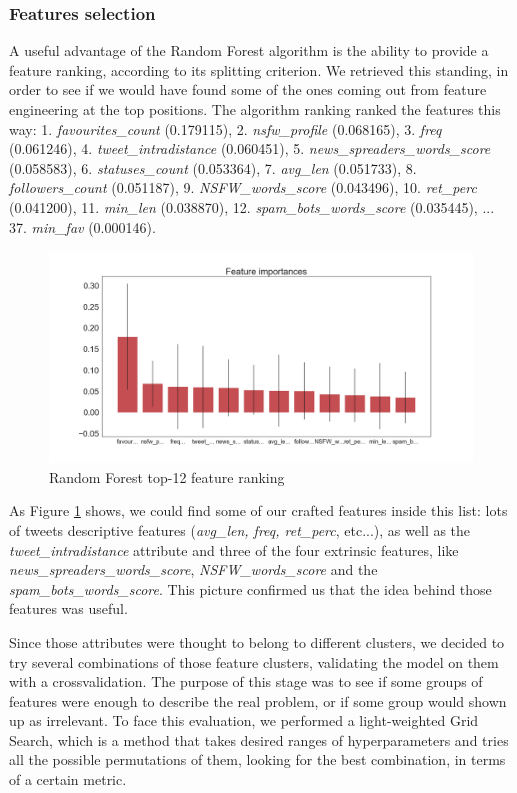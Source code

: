 \subsubsection{Features selection}
A useful advantage of the Random Forest algorithm is the ability to provide a feature ranking, according to its splitting criterion.
We retrieved this standing, in order to see if we would have found some of the ones coming out from feature engineering at the top positions.
The algorithm ranking ranked the features this way: 1. \textit{favourites\_count} (0.179115), 2. \textit{nsfw\_profile} (0.068165), 3. \textit{freq} (0.061246), 4. \textit{tweet\_intradistance} (0.060451), 5. \textit{news\_spreaders\_words\_score} (0.058583), 6. \textit{statuses\_count} (0.053364), 7. \textit{avg\_len} (0.051733), 8. \textit{followers\_count} (0.051187), 9. \textit{NSFW\_words\_score} (0.043496), 10. \textit{ret\_perc} (0.041200), 11. \textit{min\_len} (0.038870), 12. \textit{spam\_bots\_words\_score} (0.035445), ...  37. \textit{min\_fav} (0.000146).

\begin{figure}[htp!]
	\centering
	\includegraphics[width=\columnwidth]{chapter5/figure/top_12_features_importances.png}
	\caption{Random Forest top-12 feature ranking}
	\label{fig:feature_rank}
\end{figure}

As Figure \ref{fig:feature_rank} shows, we could find some of our crafted features inside this list: lots of tweets descriptive features (\textit{avg\_len, freq, ret\_perc}, etc...), as well as the \textit{tweet\_intradistance} attribute and three of the four extrinsic features, like \textit{news\_spreaders\_words\_score}, \textit{NSFW\_words\_score} and the \textit{spam\_bots\_words\_score}.
This picture confirmed us that the idea behind those features was useful.

Since those attributes were thought to belong to different clusters, we decided to try several combinations of those feature clusters, validating the model on them with a crossvalidation. The purpose of this stage was to see if some groups of features were enough to describe the real problem, or if some group would shown up as irrelevant.
To face this evaluation, we performed a light-weighted Grid Search, which is a method that takes desired ranges of hyperparameters and tries all the possible permutations of them, looking for the best combination, in terms of a certain metric.

